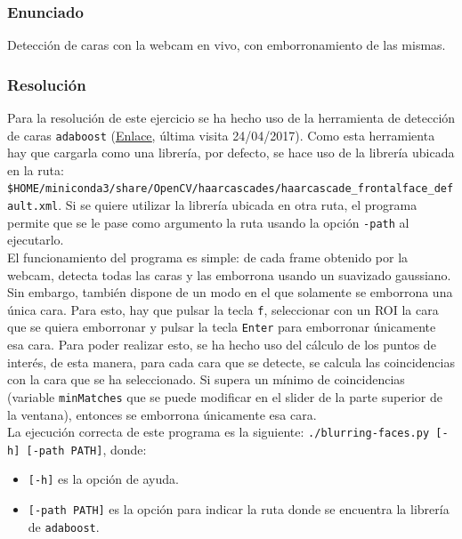 \documentclass[a4paper,10pt,titlepage,oneside,openright]{book}
\begin{document}
\subsubsection*{Enunciado}
Detección de caras con la webcam en vivo, con emborronamiento de las mismas.

\subsubsection*{Resolución}
Para la resolución de este ejercicio se ha hecho uso de la herramienta de detección de caras \texttt{adaboost} (\href{https://en.wikipedia.org/wiki/Viola\%E2\%80\%93Jones\_object\_detection\_framework}{\color{blue}\underline{Enlace}}, última visita 24/04/2017). Como esta herramienta hay que cargarla como una librería, por defecto, se hace uso de la librería ubicada en la ruta: \texttt{\$HOME/miniconda3/share/OpenCV/haarcascades/haarcascade\_frontalface\_default.xml}. Si se quiere utilizar la librería ubicada en otra ruta, el programa permite que se le pase como argumento la ruta usando la opción \texttt{-path} al ejecutarlo. \\

El funcionamiento del programa es simple: de cada frame obtenido por la webcam, detecta todas las caras y las emborrona usando un suavizado gaussiano. Sin embargo, también dispone de un modo en el que solamente se emborrona una única cara. Para esto, hay que pulsar la tecla \texttt{f}, seleccionar con un ROI la cara que se quiera emborronar y pulsar la tecla \texttt{Enter} para emborronar únicamente esa cara. Para poder realizar esto, se ha hecho uso del cálculo de los puntos de interés, de esta manera, para cada cara que se detecte, se calcula las coincidencias con la cara que se ha seleccionado. Si supera un mínimo de coincidencias (variable \texttt{minMatches} que se puede modificar en el slider de la parte superior de la ventana), entonces se emborrona únicamente esa cara. \\

La ejecución correcta de este programa es la siguiente: \texttt{./blurring-faces.py [-h] [-path PATH]}, donde:
\begin{itemize}
 \item \texttt{[-h]} es la opción de ayuda.
 \item \texttt{[-path PATH]} es la opción para indicar la ruta donde se encuentra la librería de \texttt{adaboost}.
\end{itemize}
\end{document}
